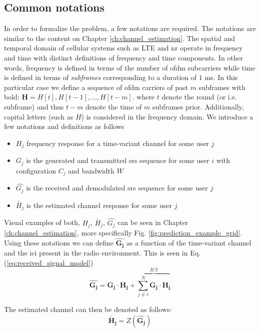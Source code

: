 \subsection{Common notations}
In order to formalize the problem, a few notations are required. The notations are similar to the content on Chapter \ref{ch:channel_estimation}. The spatial and temporal domain of cellular systems such as LTE and \gls{nr} operate in frequency and time with distinct definitions of frequency and time components. In other words, frequency is defined in terms of the number of \gls{ofdm} subcarriers while time is defined in terms of \emph{subframes} corresponding to a duration of $1$ ms. In this particular case we define a sequence of \gls{ofdm} carriers of past $m$ subframes with bold: $\mathbf{H} = H[t],H[t-1],...,H[t-m]$. where $t$ denote the round (or i.e. subframe) and thus $t - m$ denote the time of $m$ subframes prior. Additionally, capital letters (such as $H$) is considered in the frequency domain. We introduce a few notations and definitions as follows

\begin{itemize}
    \item $H_j$ frequency response for a time-variant channel for some user $j$
    \item $G_j$ is the generated and transmitted \gls{srs} sequence for some user $i$ with configuration $C_j$ and bandwidth $W$
    \item $\hat{G_j}$ is the received and demodulated \gls{srs} sequence for some user $j$
    \item $\widetilde{H_j}$ is the estimated channel response for some user $j$
\end{itemize}

Visual examples of both, $H_j$, $\widetilde{H_j}$, $\hat{G_j}$ can be seen in Chapter \ref{ch:channel_estimation}, more specifically Fig. \ref{fig:prediction_example_grid}. Using these notations we can define $\hat{\mathbf{G_j}}$ as a function of the time-variant channel and the \gls{ici} present in the radio environment. This is seen in Eq. (\ref{eq:received_signal_model})
\begin{equation}\label{eq:received_signal_model}
    \hat{\mathbf{G_j}} = \mathbf{G_j} \cdot \mathbf{H_j} + \overbrace{\sum_{j \neq i}^N \mathbf{G_j} \cdot \mathbf{H_j}}^{ICI}
\end{equation}

The estimated channel can then be denoted as follows:
\begin{equation}\label{eq:channel_estimation_function}
    \widetilde{\mathbf{H_j}} = Z(\mathbf{\hat{G_j}}) 
\end{equation}

